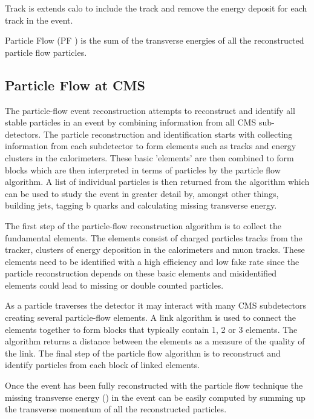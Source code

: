 Track \ETm is extends calo \ETm to include the track \Pt and remove the energy
deposit for each track in the event.

Particle Flow \ETm (PF \ETm) is the sum of the transverse energies of all the
reconstructed particle flow particles.

\subsection{Particle Flow at CMS}

The particle-flow event reconstruction attempts to reconstruct and identify all
stable particles in an event by combining information from all CMS
sub-detectors. The particle reconstruction and identification starts with
collecting information from each subdetector to form elements such as tracks
and energy clusters in the calorimeters. These basic 'elements' are then
combined to form blocks which are then interpreted in terms of particles by the
particle flow algorithm. A list of individual particles is then returned from
the algorithm which can be used to study the event in greater detail by,
amongst other things, building jets, tagging b quarks and calculating missing
transverse energy.\cite{PF}

The first step of the particle-flow reconstruction algorithm is to collect the
fundamental elements. The elements consist of charged particles tracks from the
tracker, clusters of energy deposition in the calorimeters and muon tracks.
These elements need to be identified with a high efficiency and low fake rate
since the particle reconstruction depends on these basic elements and
misidentified elements could lead to missing or double counted
particles.\cite{PF}

As a particle traverses the detector it may interact with many CMS subdetectors
creating several particle-flow elements. A link algorithm is used to connect
the elements together to form blocks that typically contain 1, 2 or 3 elements.
The algorithm returns a distance between the elements as a measure of the
quality of the link. The final step of the particle flow algorithm is to
reconstruct and identify particles from each block of linked elements.\cite{PF}

Once the event has been fully reconstructed with the particle flow technique
the missing transverse energy (\ETm) in the event can be easily computed by
summing up the transverse momentum of all the reconstructed particles.\cite{PF}

